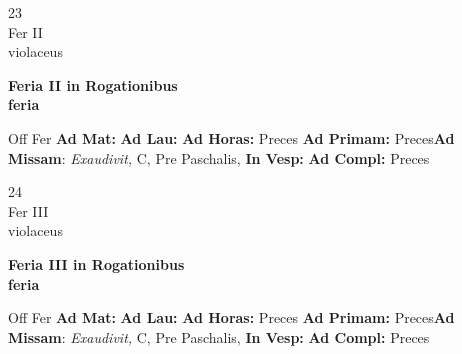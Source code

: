 \documentclass[10pt, openany]{book}
\begin{document}
        \begin{center}
            \begin{minipage}{3.5in}
                \vspace{2em}
                \begin{minipage}{0.5in}
                    {\Huge 23} \\
                    {\normalsize Fer II} \\
                    {\normalsize violaceus}
                \end{minipage}
                \begin{minipage}{3.0in}
                    \textbf{ \large Feria II in Rogationibus \\
                    \textnormal{\normalsize feria}} \\ 
                \end{minipage}
                \begin{justify}Off Fer
                    \textbf{Ad Mat: }
                    \textbf{Ad Lau: }
                    \textbf{Ad Horas: }Preces
                    \textbf{Ad Primam: }Preces\textbf{Ad Missam}: \textit{Exaudivit,} C, Pre Paschalis,  
                    \textbf{In Vesp: }
                    \textbf{Ad Compl: }Preces
                \end{justify}
            \end{minipage}
        \end{center}
    
        \begin{center}
            \begin{minipage}{3.5in}
                \vspace{2em}
                \begin{minipage}{0.5in}
                    {\Huge 24} \\
                    {\normalsize Fer III} \\
                    {\normalsize violaceus}
                \end{minipage}
                \begin{minipage}{3.0in}
                    \textbf{ \large Feria III in Rogationibus \\
                    \textnormal{\normalsize feria}} \\ 
                \end{minipage}
                \begin{justify}Off Fer
                    \textbf{Ad Mat: }
                    \textbf{Ad Lau: }
                    \textbf{Ad Horas: }Preces
                    \textbf{Ad Primam: }Preces\textbf{Ad Missam}: \textit{Exaudivit,} C, Pre Paschalis,  
                    \textbf{In Vesp: }
                    \textbf{Ad Compl: }Preces
                \end{justify}
            \end{minipage}
        \end{center}
    
\end{document}
